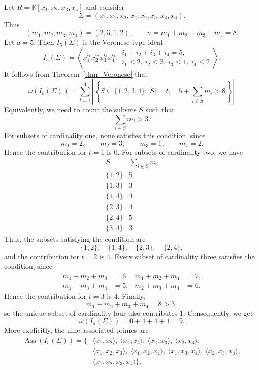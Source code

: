 \documentclass[11pt]{amsart}   %
\begin{document}

\begin{exm}
Let  $R=\mathbb K[x_1,x_2,x_3,x_4]$ and consider
$$\Sigma=(x_1,x_1,x_2,x_2,x_2,x_3,x_4,x_4).$$
Thus
\[
(m_1,m_2,m_3,m_4)=(2,3,1,2),
\qquad n=m_1+m_2+m_3+m_4=8.
\]
Let $a=5$. Then $I_5(\Sigma)$ is the Veronese type ideal
\[
I_5(\Sigma)
=
\left\langle
x_1^{i_1}x_2^{i_2}x_3^{i_3}x_4^{i_4}
:
\begin{array}{l}
i_1+i_2+i_3+i_4=5,\\
i_1\leq 2,\ i_2\leq 3,\ i_3\leq 1,\ i_4\leq 2
\end{array}
\right\rangle.
\]
It follows from  Theorem~\ref{thm_Veronese} that 
\[
\omega(I_5(\Sigma))
=
\sum_{t=1}^4
\left|
\left\{
S\subseteq\{1,2,3,4\}:
|S|=t,\quad
5+\sum_{i\in S}m_i>8
\right\}
\right|.
\]
Equivalently, we need to count the subsets $S$ such that
\[
\sum_{i\in S}m_i>3.
\]
For subsets of cardinality one, none satisfies this condition, since
\[
m_1=2,\qquad m_2=3,\qquad m_3=1,\qquad m_4=2.
\]
Hence the contribution for $t=1$ is $0$.
For subsets of cardinality two, we have
\[
\begin{array}{c|c}
S & \displaystyle\sum_{i\in S}m_i \\ \hline
\{1,2\} & 5\\
\{1,3\} & 3\\
\{1,4\} & 4\\
\{2,3\} & 4\\
\{2,4\} & 5\\
\{3,4\} & 3
\end{array}
\]
Thus, the subsets satisfying the condition are
\[
\{1,2\},\quad
\{1,4\},\quad
\{2,3\},\quad
\{2,4\},
\]
and the contribution for $t=2$ is $4$.
Every subset of cardinality three satisfies the condition, since
\[
\begin{aligned}
m_1+m_2+m_3&=6, &
m_1+m_2+m_4&=7,\\
m_1+m_3+m_4&=5, &
m_2+m_3+m_4&=6.
\end{aligned}
\]
Hence the contribution for $t=3$ is $4$.
Finally,
\[
m_1+m_2+m_3+m_4=8>3,
\]
so the unique subset of cardinality four also contributes $1$.
Consequently, we get 
\[
\omega(I_5(\Sigma))=0+4+4+1=9.
\]
More explicitly, the nine associated primes are
\[
\begin{aligned}
\operatorname{Ass}(I_5(\Sigma))
=\big\{&
\langle x_1,x_2\rangle,\ \langle x_1,x_4\rangle,\ \langle x_2,x_3\rangle,\ \langle x_2,x_4\rangle,\\
&
\langle x_1,x_2,x_3\rangle,\ \langle x_1,x_2,x_4\rangle,\
\langle x_1,x_3,x_4\rangle,\ \langle x_2,x_3,x_4\rangle,\\
&
\langle x_1,x_2,x_3,x_4\rangle
\big\}.
\end{aligned}
\]
\end{exm}
\end{document}
